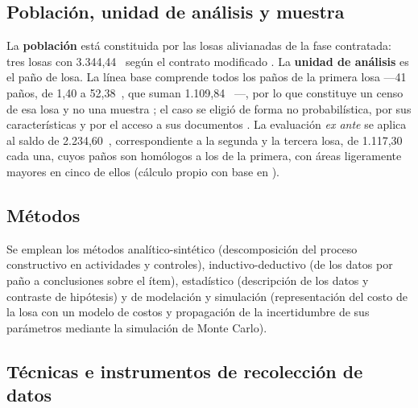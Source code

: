 \subsection{Población, unidad de análisis y muestra}
La \textbf{población} está constituida por las losas alivianadas de la fase contratada: tres losas con 3.344,44~\mdos{} según el contrato modificado \parencite[pp.~8, 16]{uatf2025pao2}. La \textbf{unidad de análisis} es el paño de losa. La línea base comprende todos los paños de la primera losa ---41 paños, de 1,40 a 52,38~\mdos{}, que suman 1.109,84~\mdos{} \parencite[pp.~28--29, 60]{uatf2025pao2}---, por lo que constituye un censo de esa losa y no una muestra \parencite[p.~196]{hernandez2018}; el caso se eligió de forma no probabilística, por sus características y por el acceso a sus documentos \parencite[p.~200]{hernandez2018}. La evaluación \emph{ex ante} se aplica al saldo de 2.234,60~\mdos{}, correspondiente a la segunda y la tercera losa, de 1.117,30~\mdos{} cada una, cuyos paños son homólogos a los de la primera, con áreas ligeramente mayores en cinco de ellos (cálculo propio con base en \cite[pp.~18--19]{uatf_item13}).

\subsection{Métodos}
Se emplean los métodos analítico-sintético (descomposición del proceso constructivo en actividades y controles), inductivo-deductivo (de los datos por paño a conclusiones sobre el ítem), estadístico (descripción de los datos y contraste de hipótesis) y de modelación y simulación (representación del costo de la losa con un modelo de costos y propagación de la incertidumbre de sus parámetros mediante la simulación de Monte Carlo).

\subsection{Técnicas e instrumentos de recolección de datos}


